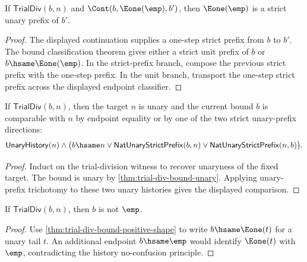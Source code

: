 \begin{theorem}
\label{thm:trialdiv-bound-unit-strict-prefix-after-cont}
If $\mathsf{TrialDiv}(b,n)$ and $\Cont(b,\Eone(\emp),b')$, then
$\Eone(\emp)$ is a strict unary prefix of $b'$.
\end{theorem}
\begin{proof}
The displayed continuation supplies a one-step strict prefix from $b$ to $b'$.
The bound classification theorem gives either a strict unit prefix of $b$ or
$b\hsame\Eone(\emp)$. In the strict-prefix branch, compose the previous strict
prefix with the one-step prefix. In the unit branch, transport the one-step
strict prefix across the displayed endpoint classifier.
\end{proof}

\begin{theorem}
\label{thm:trialdiv-target-unary-bound-trichotomy}
If \(\mathsf{TrialDiv}(b,n)\), then the target \(n\) is unary and the current
bound \(b\) is comparable with \(n\) by endpoint equality or by one of the two
strict unary-prefix directions:
$$
\mathsf{UnaryHistory}(n)\land
\bigl(b\hsame n\lor \mathsf{NatUnaryStrictPrefix}(b,n)\lor
\mathsf{NatUnaryStrictPrefix}(n,b)\bigr).
$$
\end{theorem}
\begin{proof}
Induct on the trial-division witness to recover unaryness of the fixed target.
The bound is unary by \autoref{thm:trial-div-bound-unary}. Applying unary-prefix
trichotomy to these two unary histories gives the displayed comparison.
\end{proof}

\begin{theorem}
\label{thm:trial-div-bound-not-empty}
If \(\mathsf{TrialDiv}(b,n)\), then \(b\) is not \(\emp\).
\end{theorem}
\begin{proof}
Use \autoref{thm:trial-div-bound-positive-shape} to write
\(b\hsame\Eone(t)\) for a unary tail \(t\). An additional endpoint
\(b\hsame\emp\) would identify \(\Eone(t)\) with \(\emp\), contradicting the
history no-confusion principle.
\end{proof}

